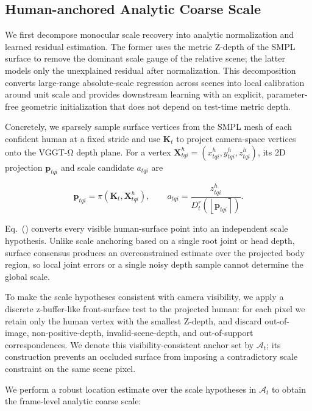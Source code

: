 \documentclass{article}
\begin{document}
\subsection{Human-anchored Analytic Coarse Scale}

We first decompose monocular scale recovery into analytic normalization and learned residual estimation. The former uses the metric Z-depth of the SMPL surface to remove the dominant scale gauge of the relative scene; the latter models only the unexplained residual after normalization. This decomposition converts large-range absolute-scale regression across scenes into local calibration around unit scale and provides downstream learning with an explicit, parameter-free geometric initialization that does not depend on test-time metric depth.

Concretely, we sparsely sample surface vertices from the SMPL mesh of each confident human at a fixed stride and use $\mathbf{K}_t$ to project camera-space vertices onto the VGGT-Ω depth plane. For a vertex $\mathbf{X}_{tqi}^{h}=(x_{tqi}^{h},y_{tqi}^{h},z_{tqi}^{h})$, its 2D projection $\mathbf{p}_{tqi}$ and scale candidate $a_{tqi}$ are

\begin{equation}
\mathbf{p}_{tqi}=\pi(\mathbf{K}_t,\mathbf{X}_{tqi}^{h}),\qquad
a_{tqi}=\frac{z_{tqi}^{h}}
{D_t^r\!\left(\left\lfloor\mathbf{p}_{tqi}\right\rceil\right)}.
\label{eq:analytic-anchor-ratio}
\end{equation}

Eq.~() converts every visible human-surface point into an independent scale hypothesis. Unlike scale anchoring based on a single root joint or head depth, surface consensus produces an overconstrained estimate over the projected body region, so local joint errors or a single noisy depth sample cannot determine the global scale.

To make the scale hypotheses consistent with camera visibility, we apply a discrete z-buffer-like front-surface test to the projected human: for each pixel we retain only the human vertex with the smallest Z-depth, and discard out-of-image, non-positive-depth, invalid-scene-depth, and out-of-support correspondences. We denote this visibility-consistent anchor set by $\mathcal{A}_t$; its construction prevents an occluded surface from imposing a contradictory scale constraint on the same scene pixel.

We perform a robust location estimate over the scale hypotheses in $\mathcal{A}_t$ to obtain the frame-level analytic coarse scale:
\end{document}
